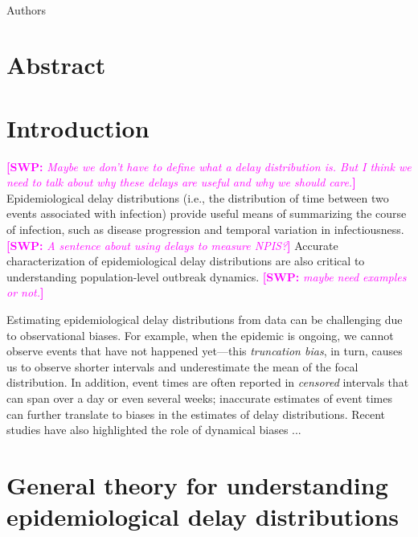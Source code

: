 \documentclass[12pt]{article}
\date{\today}
\newcommand{\comment}{\showcomment}
\newcommand{\showcomment}[3]{\textcolor{#1}{\textbf{[#2: }\textsl{#3}\textbf{]}}}
\newcommand{\swp}[1]{\comment{magenta}{SWP}{#1}}
\begin{document}
\begin{flushleft}{
	\Large
	\textbf{}
}
\newline
\\
Authors
\bigskip

\bigskip

\section*{Abstract}

\end{flushleft}

\pagebreak

\section{Introduction}

\swp{Maybe we don't have to define what a delay distribution is. But I think we need to talk about why these delays are useful and why we should care.}
Epidemiological delay distributions (i.e., the distribution of time between two events associated with infection) provide useful means of summarizing the course of infection, such as disease progression \citep{lauer2020incubation,verity2020estimates} and temporal variation in infectiousness.
\swp{A sentence about using delays to measure NPIS?}
Accurate characterization of epidemiological delay distributions are also critical to understanding population-level outbreak dynamics. \swp{maybe need examples or not.}

Estimating epidemiological delay distributions from data can be challenging due to observational biases.
For example, when the epidemic is ongoing, we cannot observe events that have not happened yet---this \emph{truncation bias}, in turn, causes us to observe shorter intervals and underestimate the mean of the focal distribution.
In addition, event times are often reported in \emph{censored} intervals that can span over a day or even several weeks;
inaccurate estimates of event times can further translate to biases in the estimates of delay distributions.
Recent studies have also highlighted the role of dynamical biases ...

\section{General theory for understanding epidemiological delay distributions}
\end{document}
